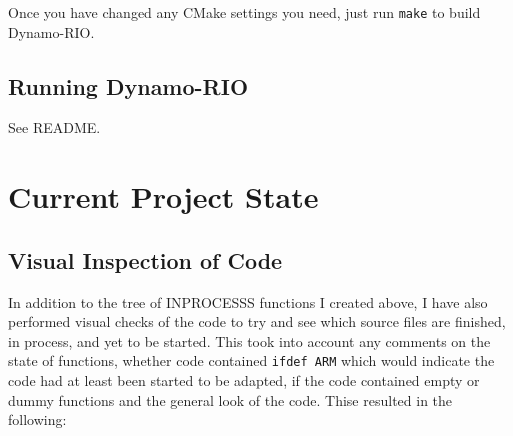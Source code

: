 \documentclass[a4paper]{article}
\begin{document}
Once you have changed any CMake settings you need, just run \texttt{make} to
build Dynamo-RIO.

\subsection{Running Dynamo-RIO}
See README.


\section{Current Project State}
\subsection{Visual Inspection of Code}
In addition to the tree of INPROCESSS functions I created above, I have also
performed visual checks of the code to try and see which source files are
finished, in process, and yet to be started. This took into account any comments
on the state of functions, whether code contained \texttt{ifdef ARM} which would
indicate the code had at least been started to be adapted, if the code contained
empty or dummy functions and the general look of the code. Thise resulted in the
following:
\end{document}
